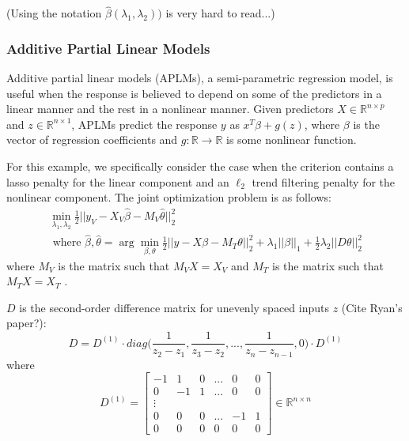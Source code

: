 \documentclass[10pt,letterpaper]{article}
\begin{document}
(Using the notation $\hat \beta(\lambda_1, \lambda_2))$ is very hard to read...)

\subsubsection{Additive Partial Linear Models}

Additive partial linear models (APLMs), a semi-parametric regression model, is useful when the response is believed to depend on some of the predictors in a linear manner and the rest in a nonlinear manner. Given predictors $X \in \mathbb{R}^{n \times p}$ and $z \in \mathbb{R}^{n \times 1}$, APLMs predict the response $y$ as $x^T\beta + g(z)$, where $\beta$ is the vector of regression coefficients and $g: \mathbb{R} \rightarrow \mathbb{R} $ is some nonlinear function.

For this example, we specifically consider the case when the criterion contains a lasso penalty for the linear component and an $\ell_2$ trend filtering penalty for the nonlinear component. The joint optimization problem is as follows:
\begin{equation}
\begin{array}{c}
\min_{\lambda_1, \lambda_2} \frac{1}{2} \bigl\lvert\bigl\lvert y_V - X_V\hat\beta - M_V \hat\theta \bigl\rvert\bigl\rvert^2_2 \\
\text{ where } \hat\beta, \hat\theta = \arg\min_{\beta, \theta} \frac{1}{2} \bigl\lvert\bigl\lvert y - X\beta - M_T \theta \bigl\rvert\bigl\rvert^2_2
+ \lambda_1 \lvert\lvert \beta \rvert \rvert_1
+ \frac{1}{2} \lambda_2 \lvert\lvert D \theta \rvert \rvert_2^2
\end{array}
\end{equation}
where $M_V$ is the matrix such that $M_V X = X_V$ and $M_T$ is the matrix such that $M_T X = X_T$ .

$D$ is the second-order difference matrix for unevenly spaced inputs $z$ (Cite Ryan's paper?):
\begin{equation}
D = D^{(1)} \cdot diag \big ( \frac{1}{z_{2} - z_1}, \frac{1}{z_{3} - z_2}, ... , \frac{1}{z_{n} - z_{n-1}}, 0 \big ) \cdot D^{(1)}
\end{equation}
where
\begin{equation}
D^{(1)} = 
\begin{bmatrix}
-1 & 1 & 0 & ... & 0 & 0 \\
0 & -1 & 1 & ... & 0 & 0 \\
\vdots \\
0 & 0 & 0 & ... & -1 & 1 \\
0 &0 & 0 &  0  &  0 & 0
\end{bmatrix}
\in
\mathbb{R}^{n\times n}
\end{equation}
\end{document}
